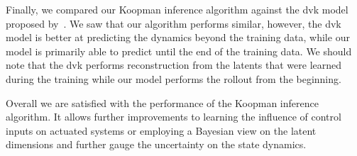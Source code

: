 Finally, we compared our Koopman inference algorithm against the \acl{dvk} model proposed by~\cite{mortonDeepVariationalKoopman2019a}. We saw that our algorithm performs similar, however, the \ac{dvk} model is better at predicting the dynamics beyond the training data, while our model is primarily able to predict until the end of the training data. We should note that the \ac{dvk} performs reconstruction from the latents that were learned during the training while our model performs the rollout from the beginning.

Overall we are satisfied with the performance of the Koopman inference algorithm. It allows further improvements to learning the influence of control inputs on actuated systems or employing a Bayesian view on the latent dimensions and further gauge the uncertainty on the state dynamics.
